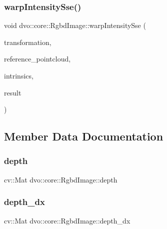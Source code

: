 \subsubsection{\texorpdfstring{warp\+Intensity\+Sse()}{warpIntensitySse()}\hspace{0.1cm}{\footnotesize\ttfamily [2/2]}}
{\footnotesize\ttfamily void dvo\+::core\+::\+Rgbd\+Image\+::warp\+Intensity\+Sse (\begin{DoxyParamCaption}\item[{const \mbox{\hyperlink{namespacedvo_1_1core_af89a8f837f3ae51ed196b7988e59e53d}{Affine\+Transform}} \&}]{transformation,  }\item[{const \mbox{\hyperlink{structdvo_1_1core_1_1_rgbd_image_a56820965eb98427d06e6733fe333cdc5}{Point\+Cloud}} \&}]{reference\+\_\+pointcloud,  }\item[{const \mbox{\hyperlink{structdvo_1_1core_1_1_intrinsic_matrix}{Intrinsic\+Matrix}} \&}]{intrinsics,  }\item[{\mbox{\hyperlink{structdvo_1_1core_1_1_rgbd_image}{Rgbd\+Image}} \&}]{result }\end{DoxyParamCaption})}



\subsection{Member Data Documentation}
\mbox{\label{structdvo_1_1core_1_1_rgbd_image_a95e43f3efef765278172153c02888d0a}} 
\subsubsection{\texorpdfstring{depth}{depth}}
{\footnotesize\ttfamily cv\+::\+Mat dvo\+::core\+::\+Rgbd\+Image\+::depth}

\mbox{\label{structdvo_1_1core_1_1_rgbd_image_adaa7647076295d4ea71566f2ea156572}} 
\subsubsection{\texorpdfstring{depth\+\_\+dx}{depth\_dx}}
{\footnotesize\ttfamily cv\+::\+Mat dvo\+::core\+::\+Rgbd\+Image\+::depth\+\_\+dx}

